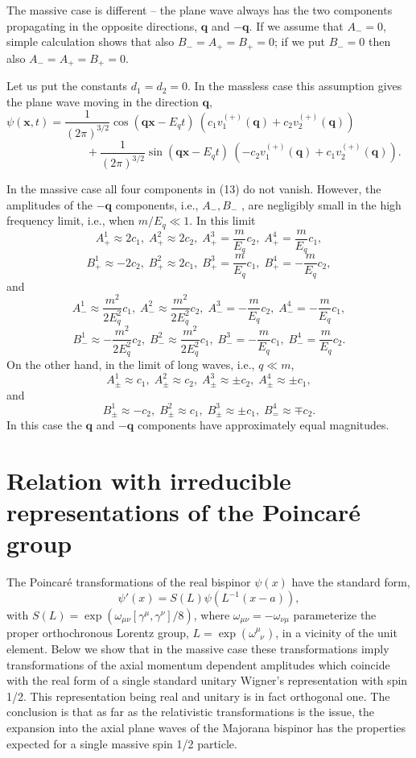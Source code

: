 \documentclass[12pt]{article}
\begin{document}
The massive case is different -- the plane wave always has the two components propagating in the opposite directions, $\mathbf{q}$ and $-\mathbf{q}$.  If we assume that $A_-=0$,  simple calculation shows that also $ B_- =A_+=B_+=0$;   if we put $B_- =0$ then   
also $ A_- =A_+=B_+=0$.

Let  us put  the constants $d_1 =d_2=0$.  In the massless case this assumption   gives the plane wave moving in the direction $\mathbf{q}$,
\[ \psi(\mathbf{x}, t) = \frac{1}{(2\pi)^{3/2}}   \cos(\mathbf{q}\mathbf{x} - E_qt) \: (c_1 v^{(+)}_1(\mathbf{q})  +c_2 v^{(+)}_2(\mathbf{q}) )  \;\;\;\;\;\;\;\;\;\;\; \;\;\;\;\;\;\;\;\;\;\; \]   \[  \;\;\;\;\;\;\;\;\;\;\; \;\;\;\;\;\;\;\;\;\;\; + \frac{1}{(2\pi)^{3/2}}\sin(\mathbf{q}\mathbf{x} - E_qt) \:(-  c_2 v^{(+)}_1(\mathbf{q})  +c_1 v^{(+)}_2(\mathbf{q})   ). \] 

  In the massive case  all four components in (13) do not vanish. 
However,   the amplitudes of the $- \mathbf{q}$  components, i.e., $A_-, B_-  $ ,  are negligibly small in the high frequency limit, i.e., when  $m/E_q \ll 1$. In this limit  
\[ A^1_+ \approx 2 c_1, \; A^2_+ \approx 2 c_2, \;  A^3_+ =\frac{m}{E_q} c_2 , \; A^4_+ = \frac{m}{E_q} c_1,  \]  \[ B^1_+ \approx -2 c_2, \; B^2_+ \approx 2 c_1, \;  B^3_+ =\frac{m}{E_q} c_1 , \; B^4_+ = - \frac{m}{E_q} c_2,  \]
and \[  A^1_- \approx \frac{m^2}{2 E_q^2} c_1, \;A^2_- \approx \frac{m^2}{2E_q^2} c_2, \;A^3_- = -\frac{m}{E_q}c_2, \; A^4_- = - \frac{m}{E_q}c_1, \] 
\[  B^1_- \approx -\frac{m^2}{2 E_q^2} c_2, \;B^2_- \approx \frac{m^2}{2E_q^2} c_1, \;B^3_- = -\frac{m}{E_q}c_1, \; B^4_- = \frac{m}{E_q}c_2. \] 
On the other hand, in the limit of long waves, i.e., $q \ll m$, 
\[A^1_{\pm} \approx c_1, \; A^2_{\pm} \approx  c_2, \;  A^3_{\pm} \approx \pm c_2 , \; A^4_{\pm} \approx \pm  c_1 ,   \]   and  \[ B^1_{\pm} \approx -c_2, \; B^2_{\pm} \approx  c_1, \;  B^3_{\pm} \approx  \pm c_1, \; B^4_= \approx  \mp c_2.  \] 
In this case  the  $\mathbf{q}$ and $-\mathbf{q}$ components  have approximately equal  magnitudes. 

\section{Relation with  irreducible representations of the Poincar\'e group} 
 The Poincar\'e  transformations of the real bispinor $\psi(x)$ have the standard form,  \begin{equation} \psi'(x) = S(L) \psi(L^{-1}(x-a)), \end{equation}
with  $S(L) = \exp(\omega_{\mu\nu} [\gamma^{\mu}, \gamma^{\nu}]/8)$, where $\omega_{\mu\nu}= - \omega_{\nu\mu}$ parameterize the proper orthochronous Lorentz group,  $L=\exp(\omega^{\mu\;\;}_{\;\;\nu})$, in a vicinity of the unit element.  Below we show that  in the massive case these transformations imply transformations of the axial momentum dependent amplitudes which coincide with the real form of a single standard unitary Wigner's representation with spin 1/2. This representation being real and unitary  is in fact  orthogonal one. The conclusion is that as far as the relativistic transformations is the issue,  the expansion into the axial plane waves of the Majorana bispinor has the properties  expected for a single massive spin 1/2 particle.  
\end{document}
